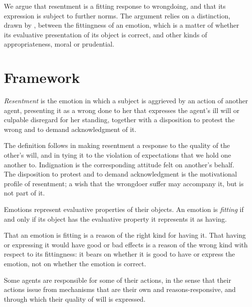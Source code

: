 \documentclass{situationist-preprint}
\begin{document}
We argue that resentment is a fitting response to wrongdoing, and that its expression is subject to further norms. The argument relies on a distinction, drawn by \citet{DArmsJacobson2000}, between the fittingness of an emotion, which is a matter of whether its evaluative presentation of its object is correct, and other kinds of appropriateness, moral or prudential.

\section{Framework}

\begin{definition}[Resentment]\label{d:resent}
\emph{Resentment} is the emotion in which a subject is aggrieved by an action of another agent, presenting it as a wrong done to her that expresses the agent's ill will or culpable disregard for her standing, together with a disposition to protest the wrong and to demand acknowledgment of it.
\end{definition}

The definition follows \citet{Strawson1962} in making resentment a response to the quality of the other's will, and \citet{Wallace1994} in tying it to the violation of expectations that we hold one another to. Indignation is the corresponding attitude felt on another's behalf. The disposition to protest and to demand acknowledgment is the motivational profile of resentment; a wish that the wrongdoer suffer may accompany it, but is not part of it.

\begin{principle}\label{p:content}
Emotions represent evaluative properties of their objects. An emotion is \emph{fitting} if and only if its object has the evaluative property it represents it as having.
\end{principle}

\begin{principle}\label{p:kinds}
That an emotion is fitting is a reason of the right kind for having it. That having or expressing it would have good or bad effects is a reason of the wrong kind with respect to its fittingness: it bears on whether it is good to have or express the emotion, not on whether the emotion is correct.
\end{principle}

\begin{assumption}\label{a:resp}
Some agents are responsible for some of their actions, in the sense that their actions issue from mechanisms that are their own and reasons-responsive, and through which their quality of will is expressed.
\end{assumption}
\end{document}
